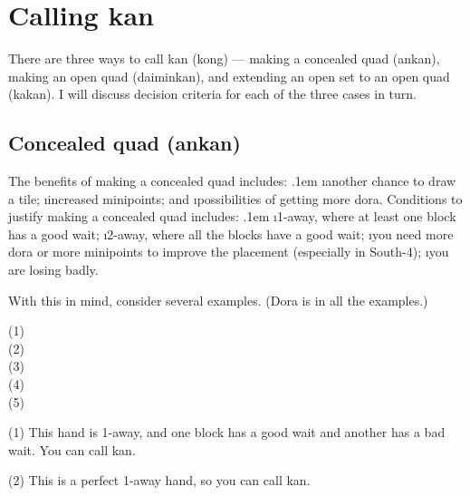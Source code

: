 \newpage

\section{Calling {\jap kan}} \label{sec:kong}  

There are three ways to call {\jap kan} (kong) --- making a concealed quad ({\jap ankan}), making an open quad ({\jap daiminkan}), and extending an open set to an open quad ({\jap kakan}). I will discuss decision criteria for each of the three cases in turn.

\subsection{Concealed quad ({\jap ankan})}
The benefits of making a concealed quad includes:
\bi \itemsep.1em
\i another chance to draw a tile;
\i increased minipoints; and
\i possibilities of getting more {\jap dora}.
\ei
Conditions to justify making a concealed quad includes:
\bi \itemsep.1em
\i 1-away, where at least one block has a good wait;
\i 2-away, where all the blocks have a good wait;
\i you need more {\jap dora} or more minipoints to improve the placement (especially in South-4);
\i you are losing badly.
\ei

With this in mind, consider several examples. ({\jap Dora} is {\LARGE\xi} in all the examples.)

\bp
{\small (1)}
\bei\bei\bei\bei\\
{\small (2)}
\bei\bei\bei\bei\\
{\small (3)}
\bei\bei\bei\bei\\
{\small (4)}
\bei\bei\bei\bei\bai\\
{\small (5)}
\bei\bei\bei\bei\bai\bai\\
\ep

\noindent (1) This hand is 1-away, and one block has a good wait and another has a bad wait. You can call {\jap kan}. 

\noindent (2) This is a perfect 1-away hand, so you can call {\jap kan}.

